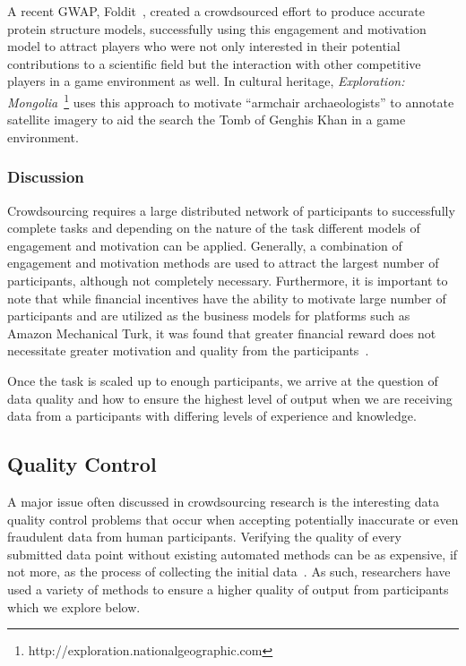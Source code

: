 \documentclass[10pt,twocolumn]{article}
\begin{document}
A recent GWAP, Foldit~\cite{Cooper2010}, created a crowdsourced effort to 
produce accurate protein structure models, successfully using this engagement
and motivation model to attract players who were not only interested in their 
potential contributions to a scientific field but the interaction with other competitive
players in a game environment as well. In cultural heritage, \textit{Exploration:
Mongolia}~\footnote{http://exploration.nationalgeographic.com} uses this approach
to motivate ``armchair archaeologists'' to annotate satellite imagery to aid
the search the Tomb of Genghis Khan in a game environment.

\subsubsection*{Discussion}

Crowdsourcing requires a large distributed network of participants to 
successfully complete tasks and depending on the nature of the task 
different models of engagement and motivation can be applied. Generally,
a combination of engagement and motivation methods are used to attract
the largest number of participants, although not completely necessary. 
Furthermore, it is important to note that while financial incentives 
have the ability to motivate large number of participants and are utilized 
as the business models for platforms such as Amazon Mechanical Turk, it 
was found that greater financial reward does not necessitate greater 
motivation and quality from the participants~\cite{Mason2010a}.

Once the task is scaled up to enough participants, we arrive at 
the question of data quality and how to ensure the highest level of output
when we are receiving data from a participants with differing levels
of experience and knowledge.

\subsection{Quality Control}
\label{sec:quality-control}

A major issue often discussed in crowdsourcing research is the interesting 
data quality control problems that occur when accepting potentially 
inaccurate or even fraudulent data from human participants. Verifying the
quality of every submitted data point without existing automated methods can 
be as expensive, if not more, as the process of collecting the initial 
data~\cite{Ipeirotis2010a}. As such, researchers have used a variety of 
methods to ensure a higher quality of output from participants which
we explore below.
\end{document}
